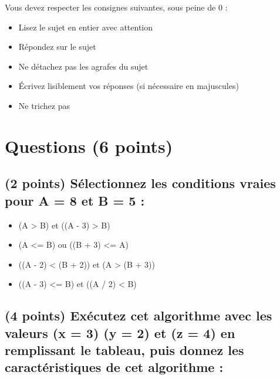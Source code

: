 \documentclass[11pt,a4paper]{article}
\begin{document}
\MakeExamTitle                   %


\bigskip

Vous devez respecter les consignes suivantes, sous peine de 0 :

\begin{itemize}
\item Lisez le sujet en entier avec attention
\item Répondez sur le sujet
\item Ne détachez pas les agrafes du sujet
\item \'Ecrivez lisiblement vos réponses (si nécessaire en majuscules)
\item Ne trichez pas
\end{itemize}



\section{Questions (6 points)}

\subsection{(2 points) Sélectionnez les conditions vraies pour A = 8 et B = 5 : }

\bigskip

\begin{itemize}
  \item[\CaseCoche] (A > B) et ((A - 3) > B)  %
  \item[\checkmark] (A <= B) ou ((B + 3) <= A)  %
  \item[\CaseCoche] ((A - 2) < (B + 2)) et (A > (B + 3))  %
  \item[\checkmark] ((A - 3) <= B) et ((A / 2) < B)  %
\end{itemize}




\subsection{(4 points) Exécutez cet algorithme avec les valeurs (x = 3) (y = 2) et (z = 4) en remplissant le tableau, puis donnez les caractéristiques de cet algorithme : }
\end{document}
